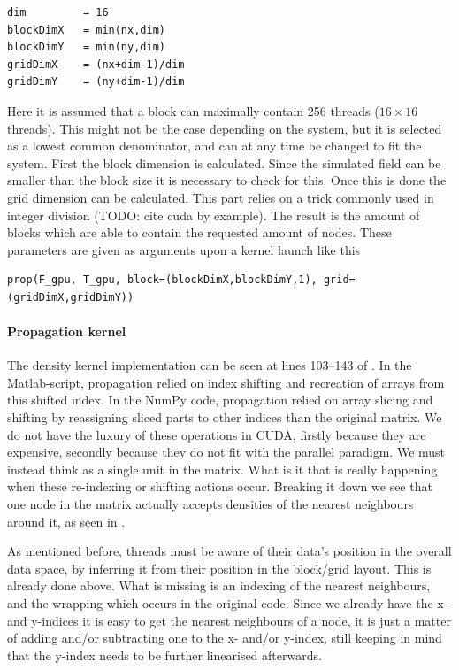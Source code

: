 \begin{verbatim}
dim         = 16
blockDimX   = min(nx,dim)
blockDimY   = min(ny,dim)
gridDimX    = (nx+dim-1)/dim
gridDimY    = (ny+dim-1)/dim
\end{verbatim}

Here it is assumed that a block can maximally contain 256 threads ($16\times16$ threads). This might not be the case depending on the system, but it is selected as a lowest common denominator, and can at any time be changed to fit the system. First the block dimension is calculated. Since the simulated field can be smaller than the block size it is necessary to check for this. Once this is done the grid dimension can be calculated. This part relies on a trick commonly used in integer division (TODO: cite cuda by example). The result is the amount of blocks which are able to contain the requested amount of nodes. These parameters are given as arguments upon a kernel launch like this

\begin{verbatim}
prop(F_gpu, T_gpu, block=(blockDimX,blockDimY,1), grid=(gridDimX,gridDimY))
\end{verbatim}


\paragraph{Propagation kernel} The density kernel implementation can be seen at lines 103--143 of . In the Matlab-script, propagation relied on index shifting and recreation of arrays from this shifted index. In the NumPy code, propagation relied on array slicing and shifting by reassigning sliced parts to other indices than the original matrix. We do not have the luxury of these operations in CUDA, firstly because they are expensive, secondly because they do not fit with the parallel paradigm. We must instead think as a single unit in the matrix. What is it that is really happening when these re-indexing or shifting actions occur. Breaking it down we see that one node in the matrix actually accepts densities of the nearest neighbours around it, as seen in .

As mentioned before, threads must be aware of their data's position in the overall data space, by inferring it from their position in the block/grid layout. This is already done above. What is missing is an indexing of the nearest neighbours, and the wrapping which occurs in the original code. Since we already have the x- and y-indices it is easy to get the nearest neighbours of a node, it is just a matter of adding and/or subtracting one to the x- and/or y-index, still keeping in mind that the y-index needs to be further linearised afterwards.

